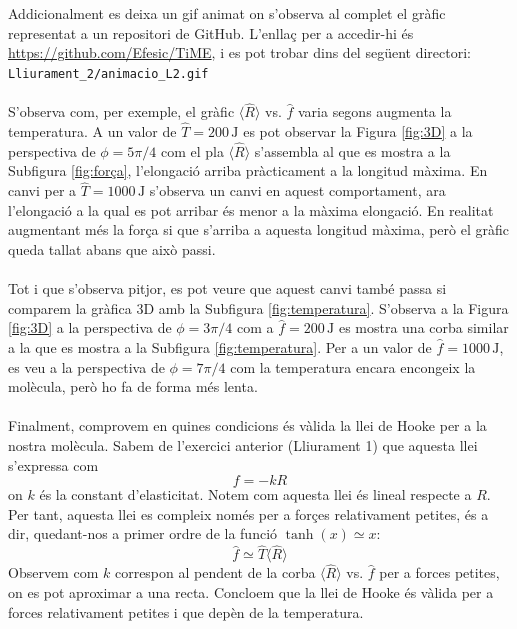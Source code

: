 \documentclass[12pt,twosides,onecolumn,openany]{article}
\begin{document}
\noindent Addicionalment es deixa un gif animat on s'observa al complet el gràfic representat a un repositori de GitHub. L'enllaç per a accedir-hi és \url{https://github.com/Efesic/TiME}, i es pot trobar dins del següent directori: \texttt{Lliurament\_2/animacio\_L2.gif}\\\\
S'observa com, per exemple, el gràfic $\langle \hat{R} \rangle$ vs. $\hat{f}$ varia segons augmenta la temperatura. A un valor de \(\hat{T} = 200 \, \text{J}\) es pot observar la Figura \ref{fig:3D} a la perspectiva de $\phi= 5\pi/4$ com el pla $\langle \hat{R} \rangle$ s'assembla al que es mostra a la Subfigura \ref{fig:força}, l'elongació arriba pràcticament a la longitud màxima. En canvi per a \(\hat{T} = 1000 \, \text{J}\) s'observa un canvi en aquest comportament, ara l'elongació a la qual es pot arribar és menor a la màxima elongació. En realitat augmentant més la força si que s'arriba a aquesta longitud màxima, però el gràfic queda tallat abans que això passi.\\\\
Tot i que s'observa pitjor, es pot veure que aquest canvi també passa si comparem la gràfica 3D amb la Subfigura \ref{fig:temperatura}. S'observa a la Figura \ref{fig:3D} a la perspectiva de $\phi= 3\pi/4$ com a \(\hat{f} = 200 \, \text{J}\) es mostra una corba similar a la que es mostra a la Subfigura \ref{fig:temperatura}. Per a un valor de \(\hat{f} = 1000 \, \text{J}\), es veu a la perspectiva de $\phi= 7\pi/4$ com la temperatura encara encongeix la molècula, però ho fa de forma més lenta.\\\\
Finalment, comprovem en quines condicions és vàlida la llei de Hooke per a la nostra molècula. Sabem de l'exercici anterior (Lliurament 1) que aquesta llei s'expressa com
\begin{equation*}
    f = -kR
\end{equation*}
on $k$ és la constant d'elasticitat. Notem com aquesta llei és lineal respecte a $R$. Per tant, aquesta llei es compleix només per a forçes relativament petites, és a dir, quedant-nos a primer ordre de la funció $\tanh{(x)} \simeq x$:
\begin{equation*}
    \hat{f} \simeq \hat{T} \langle \hat{R} \rangle
\end{equation*}
Observem com $k$ correspon al pendent de la corba $\langle \hat{R} \rangle$ vs. $\hat{f}$ per a forces petites, on es pot aproximar a una recta. Concloem que la llei de Hooke és vàlida per a forces relativament petites i que depèn de la temperatura.
\end{document}
